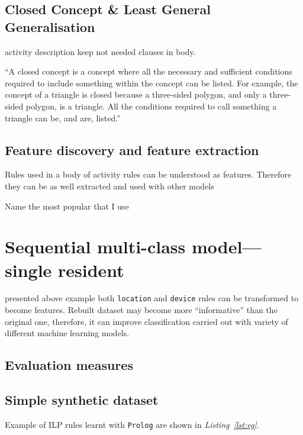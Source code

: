 \documentclass[12pt, a4paper, pdflatex, leqno, twoside, openright]{report}
\begin{document}
  \section{Closed Concept \& Least General Generalisation}
activity description
keep not needed clauses in body.

``A closed concept is a concept where all the necessary and sufficient conditions required to include something within the concept can be listed. For example, the concept of a triangle is closed because a three-sided polygon, and only a three-sided polygon, is a triangle. All the conditions required to call something a triangle can be, and are, listed.''

  \section{Feature discovery and feature extraction}
Rules used in a body of activity rules can be understood as features.
Therefore they can be as well extracted and used with other models

Name the most popular that I use


\chapter{Sequential multi-class model---single resident\label{ch:smcm}}
presented above example both \texttt{location} and \texttt{device} rules can be transformed to become features. Rebuilt dataset may become more ``informative'' than the original one, therefore, it can improve classification carried out with variety of different machine learning models.

  \section{Evaluation measures}
  \section{Simple synthetic dataset}

Example of ILP rules learnt with \texttt{Prolog} are shown in \emph{Listing~\ref{lst:eg}}.
\end{document}

